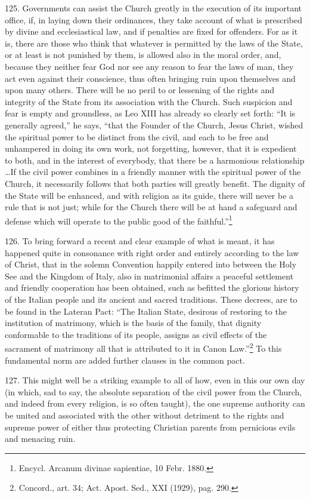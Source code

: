 \documentclass[12pt,a4paper]{book}
\begin{document}
125. Governments can assist the Church greatly in the execution of its important office, if, in laying down their ordinances, they take account of what is prescribed by divine and ecclesiastical law, and if penalties are fixed for offenders. For as it is, there are those who think that whatever is permitted by the laws of the State, or at least is not punished by them, is allowed also in the moral order, and, because they neither fear God nor see any reason to fear the laws of man, they act even against their conscience, thus often bringing ruin upon themselves and upon many others. There will be no peril to or lessening of the rights and integrity of the State from its association with the Church. Such suspicion and fear is empty and groundless, as Leo XIII has already so clearly set forth: ``It is generally agreed,'' he says, ``that the Founder of the Church, Jesus Christ, wished the spiritual power to be distinct from the civil, and each to be free and unhampered in doing its own work, not forgetting, however, that it is expedient to both, and in the interest of everybody, that there be a harmonious relationship \ldots If the civil power combines in a friendly manner with the spiritual power of the Church, it necessarily follows that both parties will greatly benefit. The dignity of the State will be enhanced, and with religion as its guide, there will never be a rule that is not just; while for the Church there will be at hand a safeguard and defense which will operate to the public good of the faithful.''\footnote{Encycl. Arcanum divinae sapientiae, 10 Febr. 1880.}

126. To bring forward a recent and clear example of what is meant, it has happened quite in consonance with right order and entirely according to the law of Christ, that in the solemn Convention happily entered into between the Holy See and the Kingdom of Italy, also in matrimonial affairs a peaceful settlement and friendly cooperation has been obtained, such as befitted the glorious history of the Italian people and its ancient and sacred traditions. These decrees, are to be found in the Lateran Pact: ``The Italian State, desirous of restoring to the institution of matrimony, which is the basis of the family, that dignity conformable to the traditions of its people, assigns as civil effects of the sacrament of matrimony all that is attributed to it in Canon Law.''\footnote{Concord., art. 34; Act. Apost. Sed., XXI (1929), pag. 290.} To this fundamental norm are added further clauses in the common pact.

127. This might well be a striking example to all of how, even in this our own day (in which, sad to say, the absolute separation of the civil power from the Church, and indeed from every religion, is so often taught), the one supreme authority can be united and associated with the other without detriment to the rights and supreme power of either thus protecting Christian parents from pernicious evils and menacing ruin.
\end{document}
